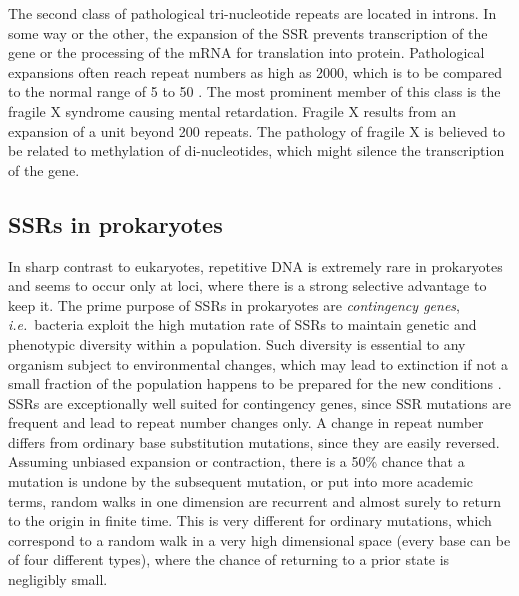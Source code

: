 The second class of pathological tri-nucleotide repeats are located in introns. In some
way or the other, the expansion of the SSR prevents transcription of the gene or the processing of the 
mRNA for translation into protein. 
Pathological expansions often reach repeat numbers as high as 2000, which is to be compared to the 
normal range of 5 to 50 \cite{Reddy_COCEB_97}. 
The most prominent member of this class is the fragile X syndrome causing mental retardation. 
Fragile X results from an expansion of a  unit beyond 200 repeats. 
The pathology of fragile X is believed to be related to methylation of  di-nucleotides,
which might silence the transcription of the gene.



\subsection{SSRs in prokaryotes\label{sec:SSR_prokaryotes}}
In sharp contrast to eukaryotes, repetitive DNA is extremely rare in prokaryotes and
seems to occur only at loci, where there is a strong selective advantage to keep it. 
The prime purpose of SSRs in prokaryotes are \emph{contingency genes}, \emph{i.e.}~bacteria 
exploit the high mutation rate of SSRs to maintain genetic and phenotypic diversity within a 
population. Such diversity is essential to any organism subject to environmental 
changes, which may lead to extinction if not a small fraction 
of the population happens to be prepared for the new conditions \cite{Kussell_Science_05}.   
SSRs are exceptionally well suited for contingency genes, since SSR mutations are frequent and
lead to repeat number changes only. A change in repeat number differs from ordinary
base substitution mutations, since they are easily reversed. Assuming unbiased expansion
or contraction, there is a 50\% chance that a mutation is undone by the subsequent mutation, 
or put into more academic terms, random walks in one dimension are recurrent and almost surely
to return to the origin in finite time. This is very different for ordinary mutations, which correspond to 
a random walk in a very high dimensional space (every base can be of four different types), where
the chance of returning to a prior state is negligibly small. 

